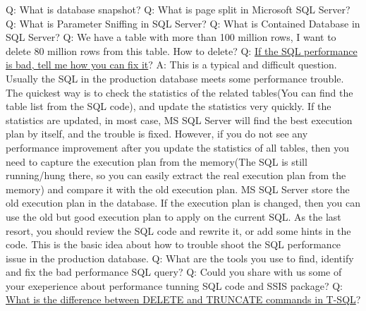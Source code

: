 \documentclass[a4paper,11pt]{article}
\begin{document}
\noindent 
Q: What is database snapshot? \newline \newline
\noindent 
Q: What is page split in Microsoft SQL Server? \newline \newline
\noindent 
Q: What is Parameter Sniffing in SQL Server? \newline \newline
\noindent 
Q: What is Contained Database in SQL Server? \newline \newline
\noindent 
Q: We have a table with more than 100 million rows, I want to delete 80 million rows from this table. How to delete? \newline \newline
\noindent 
Q: \ul{If the SQL performance is bad, tell me how you can fix it}? \newline
A: This is a typical and difficult question. Usually the SQL in the production database meets some performance trouble. The quickest way is to check the statistics of the related tables(You can find the table list from the SQL code), and update the statistics very quickly. If the statistics are updated, in most case, MS SQL Server will find the best execution plan by itself, and the trouble is fixed. However, if you do not see any performance improvement after you update the statistics of all tables, then you need to capture the execution plan from the memory(The SQL is still running/hung there, so you can easily extract the real execution plan from the memory) and compare it with the old execution plan. MS SQL Server store the old execution plan in the database. If the execution plan is changed, then you can use the old but good execution plan to apply on the current SQL. As the last resort, you should review the SQL code and rewrite it, or add some hints in the code. This is the basic idea about how to trouble shoot the SQL performance issue in the production database.\newline \newline
\noindent 
Q: What are the tools you use to find, identify and fix the bad performance SQL query? \newline \newline
\noindent 
Q: Could you share with us some of your exeperience about performance tunning SQL code and SSIS package? \newline \newline
\noindent 
Q: \ul{What is the difference between DELETE and TRUNCATE commands in T-SQL}? \newline 
\end{document}
